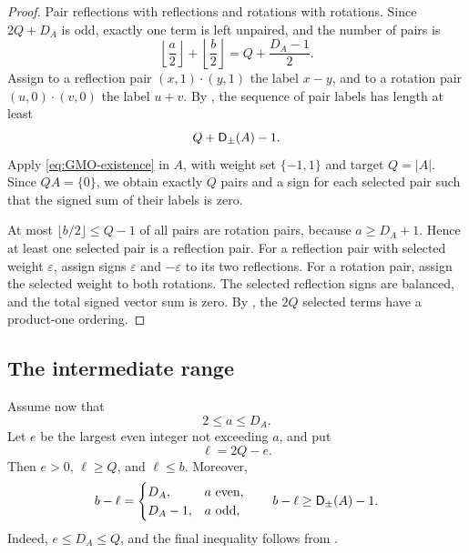 \begin{proof}
Pair reflections with reflections and rotations with rotations. Since
\(2Q+D_A\) is odd, exactly one term is left unpaired, and the number of
pairs is
\[
  \left\lfloor\frac a2\right\rfloor
  +\left\lfloor\frac b2\right\rfloor
  =Q+\frac{D_A-1}{2}.
\]
Assign to a reflection pair \((x,1)\cdot(y,1)\) the label \(x-y\), and
to a rotation pair \((u,0)\cdot(v,0)\) the label \(u+v\). By
, the sequence of pair labels has length at
least
\[
  Q+\mathsf D_{\pm}(A)-1.
\]
Apply \eqref{eq:GMO-existence} in \(A\), with weight set
\(\{-1,1\}\) and target \(Q=|A|\). Since \(QA=\{0\}\), we obtain
exactly \(Q\) pairs and a sign for each selected pair such that the
signed sum of their labels is zero.

At most \(\lfloor b/2\rfloor\le Q-1\) of all pairs are rotation pairs,
because \(a\ge D_A+1\). Hence at least one selected pair is a
reflection pair. For a reflection pair with selected weight
\(\varepsilon\), assign signs \(\varepsilon\) and \(-\varepsilon\)
to its two reflections. For a rotation pair, assign the selected weight
to both rotations. The selected reflection signs are balanced, and the
total signed vector sum is zero. By , the
\(2Q\) selected terms have a product-one ordering.
\end{proof}

\subsection{The intermediate range}

Assume now that
\begin{equation}\label{eq:middle-range}
  2\le a\le D_A.
\end{equation}
Let \(e\) be the largest even integer not exceeding \(a\), and put
\begin{equation}\label{eq:middle-target}
  \ell=2Q-e.
\end{equation}
Then \(e>0\), \(\ell\ge Q\), and \(\ell\le b\). Moreover,
\begin{equation}\label{eq:middle-surplus}
  b-\ell=
  \begin{cases}
    D_A,& a\text{ even},\\
    D_A-1,& a\text{ odd},
  \end{cases}
  \qquad
  b-\ell\ge \mathsf D_{\pm}(A)-1.
\end{equation}
Indeed, \(e\le D_A\le Q\), and the final inequality follows from
.

